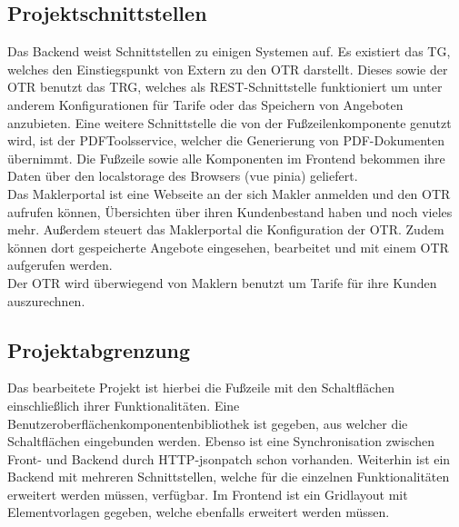 \subsection{Projektschnittstellen}
\label{projektschnittstellen}
Das Backend weist Schnittstellen zu einigen Systemen auf. Es existiert das \ac{TG}, welches den Einstiegspunkt von Extern zu den \ac{OTR} darstellt. Dieses sowie der \ac{OTR} benutzt das \ac{TRG}, welches als \gls{REST}-Schnittstelle funktioniert um unter anderem Konfigurationen für Tarife oder das Speichern von Angeboten anzubieten.
Eine weitere Schnittstelle die von der Fußzeilenkomponente genutzt wird, ist der PDFToolsservice, welcher die Generierung von PDF-Dokumenten übernimmt. Die Fußzeile sowie alle Komponenten im Frontend bekommen ihre Daten über den \gls{localstorage} des Browsers (\gls{vue} \gls{pinia}) geliefert.\\
Das Maklerportal ist eine Webseite an der sich Makler anmelden und den \ac{OTR} aufrufen können, Übersichten über ihren Kundenbestand haben und noch vieles mehr. Außerdem steuert das Maklerportal die Konfiguration der \ac{OTR}. Zudem können dort gespeicherte Angebote eingesehen, bearbeitet und mit einem \ac{OTR} aufgerufen werden.\\
Der \ac{OTR} wird überwiegend von Maklern benutzt um Tarife für ihre Kunden auszurechnen.


\subsection{Projektabgrenzung}
\label{projektabgrenzung}
Das bearbeitete Projekt ist hierbei die Fußzeile mit den Schaltflächen einschließlich ihrer Funktionalitäten. Eine Benutzeroberflächenkomponentenbibliothek ist gegeben, aus welcher die Schaltflächen eingebunden werden. Ebenso ist eine Synchronisation zwischen Front- und Backend durch \gls{HTTP}-\gls{jsonpatch} schon vorhanden. Weiterhin ist ein Backend mit mehreren Schnittstellen, welche für die einzelnen Funktionalitäten erweitert werden müssen, verfügbar. Im Frontend ist ein Gridlayout mit Elementvorlagen gegeben, welche ebenfalls erweitert werden müssen.